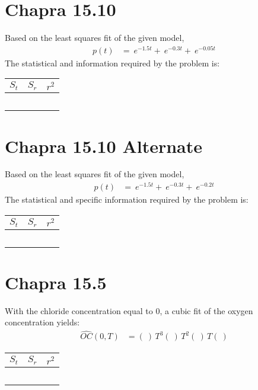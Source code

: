 \documentclass{article}
\begin{document}
\section{Chapra 15.10}
Based on the least squares fit of the given model,
\begin{align*}
p(t)&=~e^{-1.5t} + ~e^{-0.3t} + ~e^{-0.05t}
\end{align*}
The statistical and information required by the problem is:
\begin{center}
\begin{tabular}{c|c|c}
$S_t$ & $S_r$ & $r^2$\\ \hline
~ & ~ & ~ \\
\end{tabular}
\end{center}

\section{Chapra 15.10 Alternate}
Based on the least squares fit of the given model,
\begin{align*}
p(t)&=~e^{-1.5t} + ~e^{-0.3t} + ~e^{-0.2t}
\end{align*}
The statistical and specific information required by the problem is:
\begin{center}
\begin{tabular}{c|c|c}
$S_t$ & $S_r$ & $r^2$\\ \hline
~ & ~ & ~ \\
\end{tabular}
\end{center}

\section{Chapra 15.5}
With the chloride concentration equal to 0, a cubic fit of the oxygen concentration yields:
\begin{align*}
\hat{OC}(0, T)&=
(~)\,T^3  
(~)\,T^2 
(~)\,T  
(~)
\end{align*}
\begin{center}
\begin{tabular}{c|c|c}
$S_t$ & $S_r$ & $r^2$  \\ \hline
~& ~ & ~
\end{tabular}
\end{center}
\end{document}
